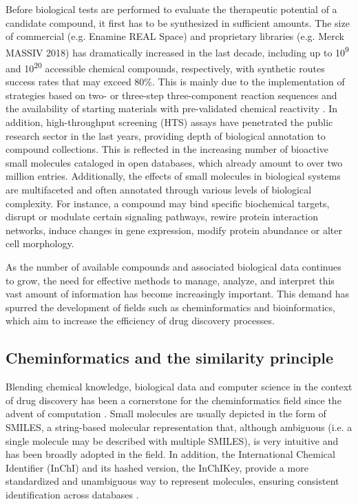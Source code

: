 Before biological tests are performed to evaluate the therapeutic potential of a candidate compound, it first has to be synthesized in sufficient amounts. The size of commercial (e.g. Enamine REAL Space) and proprietary libraries (e.g. Merck MASSIV 2018) has dramatically increased in the last decade, including up to 10\textsuperscript{9} and 10\textsuperscript{20} accessible chemical compounds, respectively, with synthetic routes success rates that may exceed 80\%\cite{stein_virtual_2020, hoffmann_next_2019, klingler_sar_2019}. This is mainly due to the implementation of strategies based on two- or three-step three-component reaction sequences and the availability of starting materials with pre-validated chemical reactivity \cite{grygorenko_generating_2020}. In addition, high-throughput screening (HTS) assays have penetrated the public research sector in the last years, providing depth of biological annotation to compound collections\cite{subramanian_next_2017, corsello_discovering_2020}. This is reflected in the increasing number of bioactive small molecules cataloged in open databases, which already amount to over two million entries\cite{gaulton_chembl_2017, wang_pubchem_2017}. Additionally, the effects of small molecules in biological systems are multifaceted and often annotated through various levels of biological complexity. For instance, a compound may bind specific biochemical targets, disrupt or modulate certain signaling pathways, rewire protein interaction networks, induce changes in gene expression, modify protein abundance or alter cell morphology.

As the number of available compounds and associated biological data continues to grow, the need for effective methods to manage, analyze, and interpret this vast amount of information has become increasingly important. This demand has spurred the development of fields such as cheminformatics and bioinformatics, which aim to increase the efficiency of drug discovery processes. 


\subsection{Cheminformatics and the similarity principle}
\label{Introduction_cheminformatics}

Blending chemical knowledge, biological data and computer science in the context of drug discovery has been a cornerstone for the cheminformatics field since the advent of computation \cite{brown_chemoinformatics_1998, engel_basic_2006}. Small molecules are usually depicted in the form of SMILES, a string-based molecular representation that, although ambiguous (i.e. a single molecule may be described with multiple SMILES), is very intuitive and has been broadly adopted in the field\cite{weininger_smiles_1988}. In addition, the International Chemical Identifier (InChI) and its hashed version, the InChIKey, provide a more standardized and unambiguous way to represent molecules, ensuring consistent identification across databases \cite{heller_inchi_2015}.

